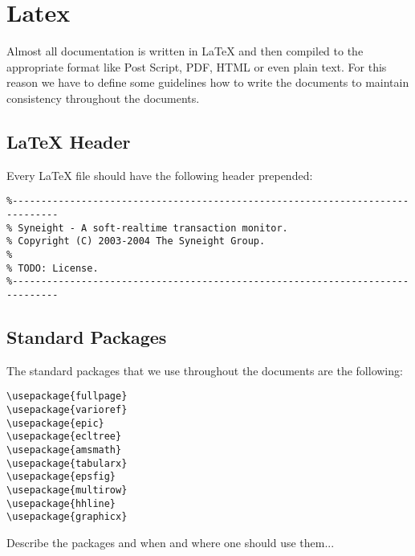 %

\chapter{Latex}
\label{cha:latex}

Almost all \SYNEIGHT documentation is written in \LaTeX{} and then compiled
to the appropriate format like Post Script, PDF, HTML or even plain text.
For this reason we have to define some guidelines how to write the
documents to maintain consistency throughout the documents.


\section{\LaTeX{} Header}
\label{sec:latex-header}

Every \LaTeX{} file should have the following header prepended:

\begin{verbatim}
%------------------------------------------------------------------------------
% Syneight - A soft-realtime transaction monitor.
% Copyright (C) 2003-2004 The Syneight Group.
%
% TODO: License.
%------------------------------------------------------------------------------
\end{verbatim}


\section{Standard Packages}
\label{sec:standard-packages}

The standard packages that we use throughout the \SYNEIGHT documents are
the following:

\begin{verbatim}
\usepackage{fullpage}
\usepackage{varioref}
\usepackage{epic}
\usepackage{ecltree}
\usepackage{amsmath}
\usepackage{tabularx}
\usepackage{epsfig}
\usepackage{multirow}
\usepackage{hhline}
\usepackage{graphicx}
\end{verbatim}

\begin{todo}
    Describe the packages and when and where one should use them...
\end{todo}


